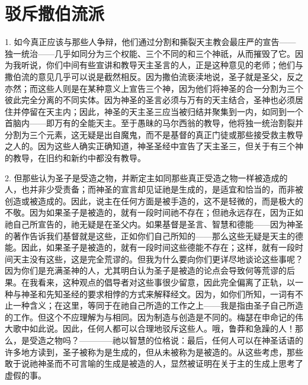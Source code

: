 
\chapter{驳斥撒伯流派}


1. 如今真正应该与那些人争辩，他们通过分割和撕裂天主教会最庄严的宣告——独一统治——几乎如同分为三个权能、三个不同的和三个神祇，从而摧毁了它。因为我听说，你们中间有些宣讲和教导天主圣言的人，正是这种意见的老师；他们与撒伯流的意见几乎可以说是截然相反。因为撒伯流亵渎地说，圣子就是圣父，反之亦然；而这些人则是在某种意义上宣告三个神，因为他们将神圣的合一分割为三个彼此完全分离的不同实体。因为神圣的圣言必须与万有的天主结合，圣神也必须居住并停留在天主内；因此，神圣的天主圣三应当被归结并聚集到一内，如同到一个首脑内——即万有的全能天主。至于愚昧的马尔西翁的教导，他将独一统治割裂并分割为三个元素，这无疑是出自魔鬼，而不是基督的真正门徒或那些接受救主教导之人的。因为这些人确实正确知道，神圣圣经中宣告了天主圣三，但关于有三个神的教导，在旧约和新约中都没有教导。\par

2. 但那些认为圣子是受造之物，并断定主如同那些真正受造之物一样被造成的人，也并非少受责备；而神圣的宣言却见证祂是生成的，是适宜和恰当的，而非被创造或被造成的。因此，说主在任何方面是被手造的，这不是轻微的，而是极大的不敬。因为如果圣子是被造的，就有一段时间祂不存在；但祂永远存在，因为正如祂自己所宣告的，祂无疑是在圣父内。如果基督是圣言、智慧和德能——因为神圣的著作告诉我们基督就是这些，正如你们自己所知的——那么这些无疑是天主的德能。因此，如果圣子是被造的，就有一段时间这些德能不存在；这样，就有一段时间天主没有这些，这是完全荒谬的。但我为什么要向你们更详尽地谈论这些事呢？因为你们是充满圣神的人，尤其明白认为圣子是被造的论点会导致何等荒谬的后果。在我看来，这种观点的倡导者对这些事很少留意，因此完全偏离了正轨，以一种与神圣和先知圣经的要求相悖的方式来解释经文。因为，如你们所知，一词有不止一种含义；在这里，等同于在祂自己所造的工作之上——我是指由圣子自己所造的工作。但这个不应理解为与相同。因为制造与创造是不同的。梅瑟在申命记的伟大歌中如此说。因此，任何人都可以合理地驳斥这些人。哦，鲁莽和急躁的人！那么，是受造之物吗？————祂以智慧的位格说：最后，任何人可以在神圣话语的许多地方读到，圣子被称为是生成的，但从未被称为是被造的。从这些考虑，那些敢于说祂神圣而不可言喻的生成是被造的人，显然被证明在关于主的生成上思考了虚假的事。\par

